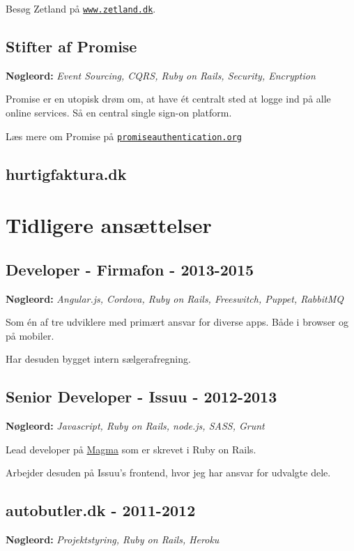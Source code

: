 \documentclass[a4paper]{article}
\newcommand{\keywords}[1]{\small\textbf{Nøgleord:} \emph{#1}\normalsize}
\begin{document}
Besøg Zetland på \href{https://www.zetland.dk}{\tt www.zetland.dk}.

\subsection*{Stifter af Promise}
\keywords{Event Sourcing, CQRS, Ruby on Rails, Security, Encryption}

Promise er en utopisk drøm om, at have ét centralt sted at logge ind på alle online services. Så en central single sign-on platform.

Læs mere om Promise på \href{https://promiseauthentication.org}{\tt promiseauthentication.org} \\

\subsection*{hurtigfaktura.dk}


\section*{Tidligere ansættelser}

\subsection*{Developer - Firmafon - 2013-2015}
\keywords{Angular.js, Cordova, Ruby on Rails, Freeswitch, Puppet, RabbitMQ}

Som én af tre udviklere med primært ansvar for diverse apps. Både i browser og på mobiler.

Har desuden bygget intern sælgerafregning.

\subsection*{Senior Developer - Issuu - 2012-2013}
\keywords{Javascript, Ruby on Rails, node.js, SASS, Grunt}

Lead developer på \href{http://www.magmahq.com}{Magma} som er skrevet i Ruby on Rails.

Arbejder desuden på Issuu's frontend, hvor jeg har ansvar for udvalgte dele.

\subsection*{autobutler.dk - 2011-2012}
\keywords{Projektstyring, Ruby on Rails, Heroku}
\end{document}
